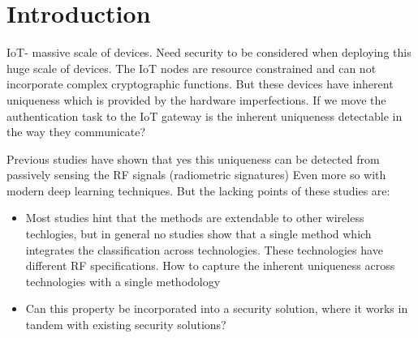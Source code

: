 \section{Introduction}

IoT- massive scale of devices.
Need security to be considered when deploying this huge scale of devices.
The IoT nodes are resource constrained and can not incorporate complex cryptographic functions.
But these devices have inherent uniqueness which is provided by the hardware imperfections.
If we move the authentication task to the IoT gateway is the inherent uniqueness detectable in the way they communicate?

Previous studies have shown that yes this uniqueness can be detected from passively sensing the RF signals (radiometric signatures)
Even more so with modern deep learning techniques.
But the lacking points of these studies are:

\begin{itemize}
	\item Most studies hint that the methods are extendable to other wireless techlogies, but in general no studies show that a single method which integrates the classification across technologies. These technologies have different RF specifications. How to capture the inherent uniqueness across technologies with a single methodology
	\item Can this property be incorporated into a security solution, where it works in tandem with existing security solutions?
\end{itemize}
